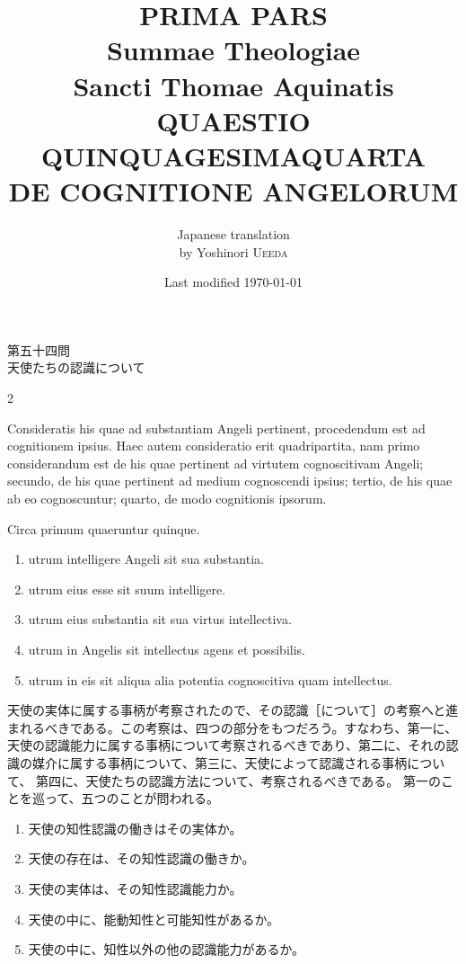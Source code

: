 \documentclass[paper=a4paper,fontsize=10pt,jafontsize=9pt,titlepage]{jlreq}
\title{{\bfseries PRIMA PARS}\\{\Huge Summae Theologiae}\\Sancti Thomae
Aquinatis\\{\sffamily QUAESTIO QUINQUAGESIMAQUARTA}\\DE COGNITIONE ANGELORUM}
\author{Japanese translation\\by Yoshinori {\scshape Ueeda}}
\date{Last modified \today}
\begin{document}
\maketitle
\pagestyle{fancy}

\begin{center}
{\Large 第五十四問\\天使たちの認識について}
\end{center}

\begin{paracol}{2}

Consideratis his quae ad substantiam Angeli pertinent, procedendum est
ad cognitionem ipsius. Haec autem consideratio erit quadripartita, nam
primo considerandum est de his quae pertinent ad virtutem cognoscitivam
Angeli; secundo, de his quae pertinent ad medium cognoscendi ipsius;
tertio, de his quae ab eo cognoscuntur; quarto, de modo cognitionis
ipsorum.

Circa primum quaeruntur quinque. 

\begin{enumerate}
 \item utrum intelligere Angeli sit sua substantia.
 \item utrum eius esse sit suum intelligere. 
 \item utrum eius substantia sit sua virtus intellectiva.
 \item utrum in Angelis sit intellectus agens et possibilis. 
 \item utrum in eis sit aliqua alia potentia cognoscitiva quam intellectus.
\end{enumerate}

\switchcolumn

天使の実体に属する事柄が考察されたので、その認識［について］の考察へと進
まれるべきである。この考察は、四つの部分をもつだろう。すなわち、第一に、
天使の認識能力に属する事柄について考察されるべきであり、第二に、それの認
識の媒介に属する事柄について、第三に、天使によって認識される事柄について、
第四に、天使たちの認識方法について、考察されるべきである。
第一のことを巡って、五つのことが問われる。

\begin{enumerate}
 \item 天使の知性認識の働きはその実体か。
 \item 天使の存在は、その知性認識の働きか。
 \item 天使の実体は、その知性認識能力か。
 \item 天使の中に、能動知性と可能知性があるか。
 \item 天使の中に、知性以外の他の認識能力があるか。
\end{enumerate}

\end{paracol}
\newpage
{}
{}
\setcounter{section}{1}
\setcounter{subsection}{0}
\end{document}
